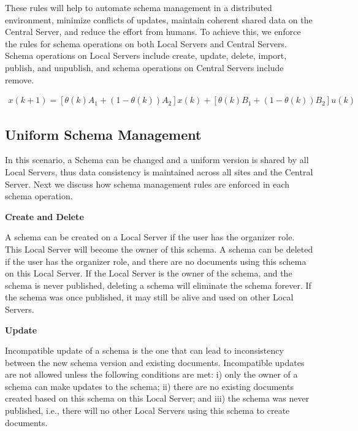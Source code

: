 \documentclass{doublecol-new}
\theoremstyle{TH}{
\newtheorem{lemma}{Lemma}
\newtheorem{theorem}[lemma]{Theorem}
\newtheorem{corrolary}[lemma]{Corrolary}
\newtheorem{conjecture}[lemma]{Conjecture}
\newtheorem{proposition}[lemma]{Proposition}
\newtheorem{claim}[lemma]{Claim}
\newtheorem{stheorem}[lemma]{Wrong Theorem}
\newtheorem{algorithm}{Algorithm}
}
\theoremstyle{THrm}{
\newtheorem{definition}{Definition}[section]
\newtheorem{question}{Question}[section]
\newtheorem{remark}{Remark}
\newtheorem{scheme}{Scheme}
}
\theoremstyle{THhit}{
\newtheorem{case}{Case}[section]
}
\begin{document}
These rules will help to automate schema management in a distributed
environment, minimize conflicts of updates, maintain coherent shared
data on the Central Server, and reduce the effort from humans.  To
achieve this, we enforce the rules for schema operations on both
Local Servers and Central Servers. Schema operations on Local
Servers include create, update, delete, import, publish, and
unpublish, and schema operations on Central Servers include remove.

\begin{eqnarray}
x(k + 1) = \left[{\theta (k)A_1  + \left( {1 - \theta (k)}
\right)A_2} \right]x(k) + \left[ {\theta (k)B_1  + \left({1 - \theta
(k)} \right)B_2 } \right]u(k)\nonumber
\end{eqnarray}

\subsection{Uniform Schema Management}


In this scenario, a Schema can be changed and a uniform version is
shared by all Local Servers, thus data consistency is maintained
across all sites and the Central Server.   Next we discuss how
schema management rules are enforced in each schema operation.

\textbf{Create and Delete}

A schema can be created on a Local Server if the user has the
organizer role. This Local Server will become the owner of this
schema. A schema can be  deleted  if the user has the organizer
role, and there are no documents using this schema on this Local
Server.  If the Local Server is the owner of the schema, and the
schema is never published,  deleting a schema will eliminate the
schema forever. If the schema was once published, it may still be
alive and used on other Local Servers.

\textbf{Update}

Incompatible update of a schema is the one that can lead to
inconsistency between the new schema version and existing documents.
Incompatible updates are not allowed unless the following conditions
are met:  i) only the owner of a schema can make updates to the
schema; ii) there are no existing documents created based on  this
schema on this Local Server; and iii) the schema was never
published, i.e., there will no other Local Servers using this schema
to create documents.
\end{document}
